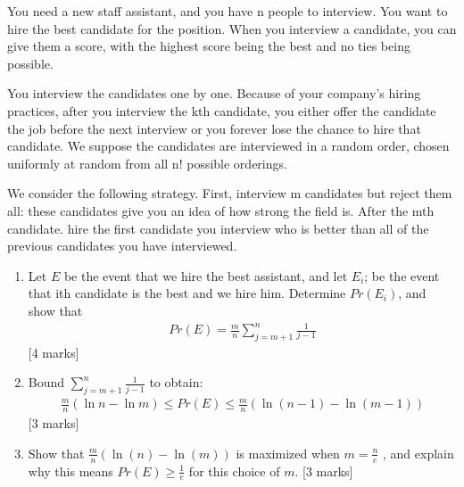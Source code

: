 \begin{que}
	You need a new staff assistant, and you have n people to interview. You
	want to hire the best candidate for the position. When you interview a
	candidate, you can give them a score, with the highest score being the
	best and no ties being possible.

	You interview the candidates one by one. Because of your company’s
	hiring practices, after you interview the kth candidate, you either
	offer the candidate the job before the next interview or you forever
	lose the chance to hire that candidate. We suppose the candidates are
	interviewed in a random order, chosen uniformly at random from all n!
	possible orderings.

	We consider the following strategy. First, interview m candidates but
	reject them all: these candidates give you an idea of how strong the
	field is. After the mth candidate. hire the first candidate you
	interview who is better than all of the previous candidates you have
	interviewed.

	\begin{enumerate}
		\item Let $E$ be the event that we hire the best assistant, and let $E_i$;
		      be the event that ith candidate is the best and we hire him.
		      Determine $Pr(E_i)$, and show that
		      \begin{align}
			      Pr(E) = \frac{m}{n}\sum_{j=m+1}^{n} \frac{1}{j-1}
		      \end{align}
		      \hspace*{\fill}[4 marks]
		\item Bound $\sum_{j=m+1}^n \frac{1}{j-1}$ to obtain:
		      \begin{align}
			      \frac{m}{n}(\ln{n} - \ln{m}) \leq Pr(E) \leq
			      \frac{m}{n}(\ln(n-1) - \ln(m-1))
		      \end{align}
		      \hspace*{\fill}[3 marks]
		\item Show that $\frac{m}{n}(\ln(n) - \ln(m))$ is maximized
		      when $m = \frac{n}{e}$ , and explain why this means $Pr(E)
			      \geq \frac{1}{e}$ for this choice of $m$.
		      \hspace*{\fill}[3 marks]
	\end{enumerate}
\end{que}

\begin{tcolorbox}
	\begin{sol}

	\end{sol}
\end{tcolorbox}
